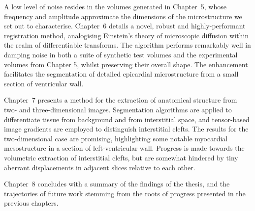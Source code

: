   A low level of noise resides in the volumes generated in Chapter~5, whose frequency and amplitude approximate the dimensions of the microstructure we set out to characterise. Chapter~6 details a novel, robust and highly-performant registration method, analogising Einstein's theory of microscopic diffusion within the realm of differentiable transforms. The algorithm performs remarkably well in damping noise in both a suite of synthetic test volumes and the experimental volumes from Chapter 5, whilst preserving their overall shape. The enhancement facilitates the segmentation of detailed epicardial microstructure from a small section of ventricular wall.
  
  Chapter~7 presents a method for the extraction of anatomical structure from two- and three-dimensional images. Segmentation algorithms are applied to differentiate tissue from background and from interstitial space, and tensor-based image gradients are employed to distinguish interstitial clefts.  The results for the two-dimensional case are promising, highlighting some notable myocardial mesostructure in a section of left-ventricular wall. Progress is made towards the volumetric extraction of interstitial clefts, but are somewhat hindered by tiny aberrant displacements in adjacent slices relative to each other.
  
  Chapter~8 concludes with a summary of the findings of the thesis, and the  trajectories of future work stemming from the roots of progress presented in the previous chapters.
